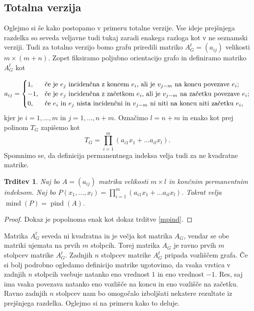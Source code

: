 \documentclass[12pt,a4paper,twoside]{article}
\theoremstyle{definition} %
\theoremstyle{plain} %
\newtheorem{trditev}[definicija]{Trditev}
\numberwithin{equation}{section}  %
\DeclareMathOperator{\mind}{mind}
\DeclareMathOperator{\pind}{pind}
\begin{document}
\subsection{Totalna verzija}
Oglejmo si še kako postopamo v primeru totalne verzije. Vse ideje prejšnjega razdelka so seveda veljavne tudi tukaj zaradi enakega razloga kot v ne seznamski verziji. Tudi za totalno verzijo bomo grafu priredili matriko $A_G^t = (a_{ij})$ velikosti $m \times (m+n)$. Zopet fiksiramo poljubno orientacijo grafo in definiramo matriko $A_G^t$ kot

\begin{equation*}
a_{ij} = 
\begin{cases}

1, & \text{če je $e_j$ incidenčna z koncem $e_i$, ali je $v_{j-m}$ na koncu povezave $e_i$} ;\\ 
	-1, & \text{če je $ e_j$ incidenčna z začetkom  $e_i$, ali je $v_{j-m}$ na začetku povezave $e_i$}; \\

0, & \text{če $e_i$ in $e_j$ nista incidenčni in $v_{j-m}$ ni niti na koncu niti začetku $e_i$,}
\end{cases}
\end{equation*}
kjer je $i=1,\ldots, m$ in $j=1, \ldots, n+m$. Označimo $l=n+m$ in enako kot prej  polinom $T_G$ zapišemo kot 
$$T_G = \prod_{i=1}^m (a_{i1}x_1 + \ldots a_{il}x_l).$$
Spomnimo se, da definicija permanentnega indeksa velja tudi za ne kvadratne matrike.
\begin{trditev}
Naj bo $A = (a_{ij})$  matrika velikosti $m \times l$ in končnim permanentnim indeksom. Naj bo $P(x_1, \ldots, x_l) = \prod_{i=1}^m (a_{i1}x_1 + \ldots a_{il}x_l)$. Takrat velja $\mind(P) = \pind(A)$.
\end{trditev}
\begin{proof}
Dokaz je popolnoma enak kot dokaz trditve \ref{mpind}.
\end{proof}
Matrika $A_G^t$ seveda ni kvadratna in je večja kot matrika $A_G$, vendar se obe matriki ujemata na prvih $m$ stolpcih. Torej matrika $A_G$ je ravno prvih $m$ stolpcev matrike $A_G^t$. Zadnjih $n$ stolpcev matrike $A_G^t$ pripada vozliščem grafa. Če si bolj podrobno ogledamo definicijo matrike ugotovimo, da vsaka vrstica v zadnjih $n$ stolpcih vsebuje natanko eno vrednost $1$ in eno vrednost $-1$. Res, saj ima vsaka povezava natanko eno vozlišče na koncu in eno vozlišče na začetku. Ravno zadnjih $n$ stolpcev nam bo omogočalo izboljšati nekatere rezultate iz prejšnjega razdelka. Oglejmo si na primeru kako to deluje.
\end{document}
